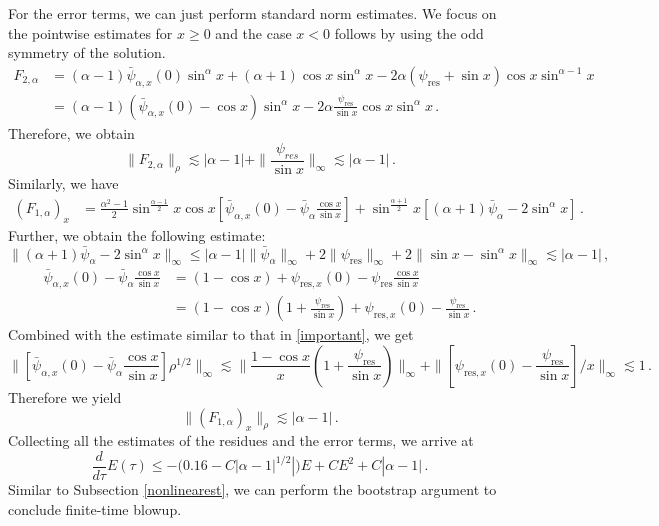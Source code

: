 \documentclass[12pt]{caltech_thesis}
\numberwithin{equation}{section}
\begin{document}
 For the error terms, we can just perform standard norm estimates.  We focus on the pointwise estimates for $x\geq0$ and the case $x<0$ follows by using the odd symmetry of the solution.
 $$
\begin{aligned}
    F_{2,\alpha}&=(\alpha-1)\bar{\psi}_{\alpha,x}(0)\sin^{\alpha} x+(\alpha+1)\cos x\sin^{\alpha} x-2\alpha(\psi_\text{res}+\sin x)\cos x\sin^{\alpha-1} x\\&=(\alpha-1)(\bar{\psi}_{\alpha,x}(0)-\cos x)\sin^{\alpha} x-2\alpha\frac{\psi_{\text{res}}}{\sin x}\cos x\sin^{\alpha} x\,.
\end{aligned}
$$
Therefore, we obtain $$\|F_{2,\alpha}\|_{\rho}\lesssim |\alpha-1|+\|\frac{\psi_{res}}{\sin x}\|_{\infty}\lesssim |\alpha-1|\,.$$
Similarly, we have $$
\begin{aligned}
    (F_{1,\alpha})_x&=\frac{\alpha^2-1}{2}\sin^{\frac{\alpha-1}{2}} x\cos x[\bar{\psi}_{\alpha,x}(0)-\bar{\psi}_{\alpha}\frac{\cos x}{\sin x}]+\sin^{\frac{\alpha+1}{2}}x[(\alpha+1)\bar{\psi}_{\alpha}-2\sin^{\alpha}x]\,.
\end{aligned}
$$
Further, we obtain the following estimate: 
$$\|(\alpha+1)\bar{\psi}_{\alpha}-2\sin^{\alpha}x\|_{\infty}\leq |\alpha-1|\|\bar{\psi}_{\alpha}\|_{\infty}+2\|\psi_\text{res}\|_{\infty}+2\|\sin x-\sin^{\alpha}x\|_{\infty}\lesssim|\alpha-1|\,,$$
$$\begin{aligned}\bar{\psi}_{\alpha,x}(0)-\bar{\psi}_{\alpha}\frac{\cos x}{\sin x}&=(1-\cos x)+\psi_{\text{res},x}(0)-\psi_\text{res}\frac{\cos x}{\sin x}\\&=(1-\cos x)(1+\frac{\psi_\text{res}}{\sin x})+\psi_{\text{res},x}(0)-\frac{\psi_\text{res}}{\sin x}\,.\end{aligned}$$
Combined with the estimate similar to that in \eqref{important}, we get 
$$\|[\bar{\psi}_{\alpha,x}(0)-\bar{\psi}_{\alpha}\frac{\cos x}{\sin x}]\rho^{1/2}\|_{\infty}\lesssim\|\frac{1-\cos x}{x}(1+\frac{\psi_\text{res}}{\sin x})\|_{\infty}+\|[\psi_{\text{res},x}(0)-\frac{\psi_\text{res}}{\sin x}]/x\|_{\infty}\lesssim 1\,.$$
Therefore we yield $$\|(F_{1,\alpha})_x\|_{\rho}\lesssim |\alpha-1|\,.$$
Collecting all the estimates of the residues and the error terms, we arrive at \begin{equation*}
    \frac{d}{d\tau}E(\tau)\leq -(0.16-C|\alpha-1|^{1/2}|)E+CE^2+C|\alpha-1|\,.
\end{equation*}
Similar to Subsection \ref{nonlinearest}, we can perform the bootstrap argument to conclude finite-time blowup.
\end{document}
